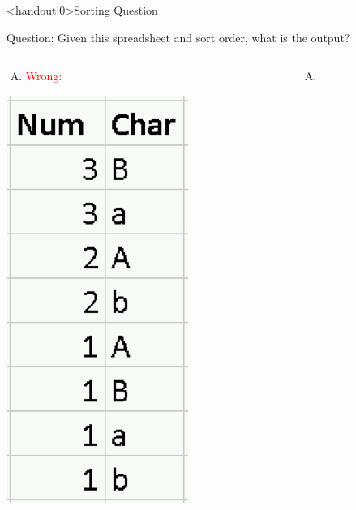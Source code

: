 \documentclass[xcolor=svgnames]{beamer}
\newcommand{\red}[1]{\textcolor{red}{#1}}
\begin{document}
\begin{frame}<handout:0>{Sorting Question}
\begin{exampleblock}{Question:} Given this spreadsheet and sort order, what is the output?
\end{exampleblock}
\begin{columns}[T] %
\begin{column}{.33\textwidth}
\vspace{-1em}
\begin{enumerate}[A)]
\item \red{Wrong:}{}
\end{enumerate}
 \includegraphics[height=.6\textheight]{sortA}
\end{column}%
\hfill%
\begin{column}{.33\textwidth}
\vspace{-1em}
\begin{enumerate}[B)]
\item {}
\end{enumerate}

\end{column}
\end{columns}
\end{frame}
\end{document}
